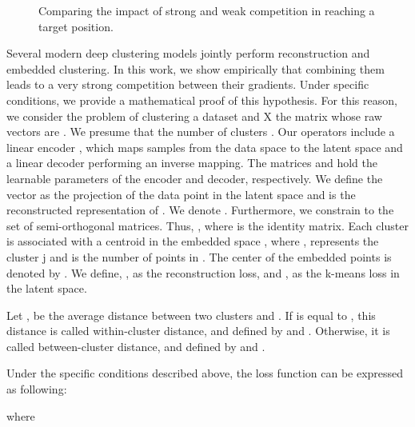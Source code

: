 \documentclass{article}
\begin{document}
\begin{figure}[ht]
\vskip 0.2in 
\centering
    \caption{Comparing the impact of strong and weak competition in reaching a target position.}
    \label{fig:competition}
\end{figure}

Several modern deep clustering models \cite{paper28, paper29, paper36, paper35} jointly perform reconstruction and embedded clustering. In this work, we show empirically that combining them leads to a very strong competition between their gradients. Under specific conditions, we provide a mathematical proof of this hypothesis. For this reason, we consider the problem of clustering a dataset  and X the matrix whose raw vectors are . We presume that the number of clusters . Our operators include a linear encoder , which maps samples from the data space to the latent space and a linear decoder  performing an inverse mapping. The matrices  and  hold the learnable parameters of the encoder and decoder, respectively. We define the vector   as the projection of the data point  in the latent space and  is the reconstructed representation of . We denote . Furthermore, we constrain  to the set of semi-orthogonal matrices. Thus, , where  is the identity matrix. Each cluster is associated with a centroid  in the embedded space , where ,   represents the cluster j and  is the number of points in . The center of the embedded points is denoted by . We define, , as the reconstruction loss, and , as the k-means loss in the latent space.





Let , be the average distance between two clusters  and . If  is equal to , this distance is called within-cluster distance, and defined by  and . Otherwise, it is called between-cluster distance, and defined by  and .



\begin{theorem}
Under the specific conditions described above, the loss function  can be expressed as following:



where 



\end{theorem}
\end{document}

